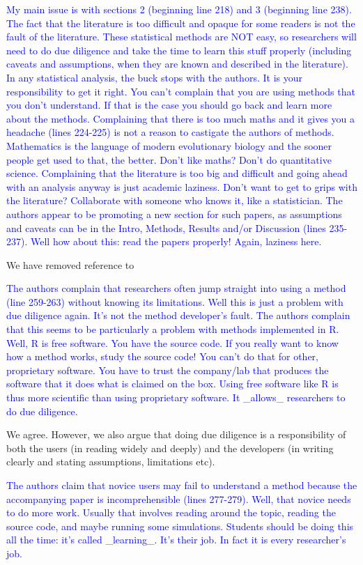 \documentclass[12pt]{letter}
\begin{document}
\begin{letter}{}
\textcolor{blue}{My main issue is with sections 2 (beginning line 218) and 3 (beginning line 238). The fact that the literature is too difficult and opaque for some readers is not the fault of the literature. These statistical methods are NOT easy, so researchers will need to do due diligence and take the time to learn this stuff properly (including caveats and assumptions, when they are known and described in the literature). In any statistical analysis, the buck stops with the authors. It is your responsibility to get it right. You can't complain that you are using methods that you don't understand. If that is the case you should go back and learn more about the methods. Complaining that there is too much maths and it gives you a headache (lines 224-225) is not a reason to castigate the authors of methods. Mathematics is the language of modern evolutionary biology and the sooner people get used to that, the better. Don't like maths? Don't do quantitative science. Complaining that the literature is too big and difficult and going ahead with an analysis anyway is just academic laziness. Don't want to get to grips with the literature? Collaborate with someone who knows it, like a statistician. The authors appear to be promoting a new section for such papers, as assumptions and caveats can be in the Intro, Methods, Results and/or Discussion (lines 235-237). Well how about this: read the papers properly! Again, laziness here.}

We have removed reference to 

\textcolor{blue}{The authors complain that researchers often jump straight into using a method (line 259-263) without knowing its limitations. Well this is just a problem with due diligence again. It's not the method developer's fault. The authors complain that this seems to be particularly a problem with methods implemented in R. Well, R is free software. You have the source code. If you really want to know how a method works, study the source code! You can't do that for other, proprietary software. You have to trust the company/lab that produces the software that it does what is claimed on the box. Using free software like R is thus more scientific than using proprietary software. It \_allows\_ researchers to do due diligence.}

We agree. However, we also argue that doing due diligence is a responsibility of both the users (in reading widely and deeply) and the developers (in writing clearly and stating assumptions, limitations etc). 

\textcolor{blue}{The authors claim that novice users may fail to understand a method because the accompanying paper is incomprehensible (lines 277-279). Well, that novice needs to do more work. Usually that involves reading around the topic, reading the source code, and maybe running some simulations. Students should be doing this all the time: it's called \_learning\_. It's their job. In fact it is every researcher's job.}


\end{letter}
\end{document}
